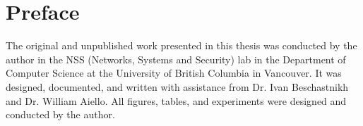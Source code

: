 
\chapter{Preface} 

The original and unpublished work presented in this thesis was conducted by the author in the NSS (Networks, Systems and Security) lab in the Department of Computer Science at the University of
British Columbia in Vancouver. It was designed, documented, and written with assistance from Dr. Ivan Beschastnikh and Dr. William Aiello. All figures, tables, and experiments were designed and conducted by the author.
